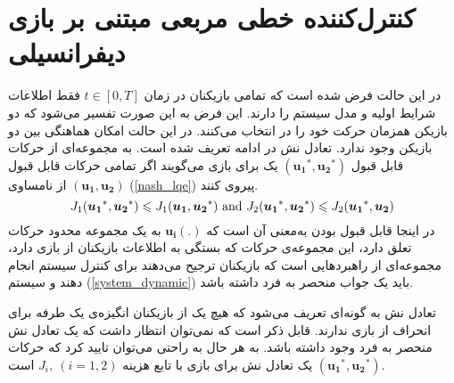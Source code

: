 \section{کنترل‌کننده خطی مربعی مبتنی بر بازی دیفرانسیلی}\label{LQDG}
در این حالت فرض شده است که تمامی بازیکنان در زمان 
$t \in [0, T]$
فقط اطلاعات شرایط اولیه و مدل سیستم را دارند. این فرض به این صورت تفسیر می‌شود که دو بازیکن همزمان حرکت خود را در انتخاب می‌کنند. در این حالت امکان هماهنگی بین دو بازیکن وجود ندارد. تعادل نش در ادامه تعریف شده ‌است.
به مجموعه‌ای از حرکات قابل قبول 
$(\boldsymbol{u_1}^*,  \boldsymbol{u_2}^*)$
یک  برای بازی می‌گویند اگر تمامی حرکات قابل قبول 
$(\boldsymbol{u_1},  \boldsymbol{u_2})$
از نامساوی (\ref{nash_lqe}) پیروی کنند.
\begin{equation}\label{nash_lqe}
	J_1(\boldsymbol{u_1}^*, \boldsymbol{u_2}^*)\leq J_1(\boldsymbol{u_1}, \boldsymbol{u_2}^*) \text{\rm{ and }}
	J_2(\boldsymbol{u_1}^*, \boldsymbol{u_2}^*)\leq 
	J_2(\boldsymbol{u_1}^*, \boldsymbol{u_2})
\end{equation}
در اینجا قابل قبول بودن به‌معنی آن است که
$\boldsymbol{u_i}(.)$
به یک مجموعه محدود حرکات تعلق دارد، این مجموعه‌ی حرکات که بستگی به اطلاعات بازیکنان از بازی دارد، مجموعه‌ای از راهبردهایی است که بازیکنان ترجیح می‌دهند برای کنترل سیستم انجام دهند و سیستم 
(\ref{system_dynamic})
باید یک جواب منحصر به فرد داشته باشد. 


تعادل نش به گونه‌ای تعریف می‌شود که هیچ یک از بازیکنان انگیزه‌ی یک طرفه برای انحراف از بازی ندارند. قابل ذکر است که نمی‌توان انتظار داشت که یک تعادل نش منحصر به فرد وجود داشته باشد. به هر حال به راحتی می‌توان تایید کرد که حرکات
$(\boldsymbol{u_1}^*, \boldsymbol{u_2}^*)$
یک تعادل نش برای بازی با تابع هزینه
$J_i,~ (i = 1, 2)$
است.


